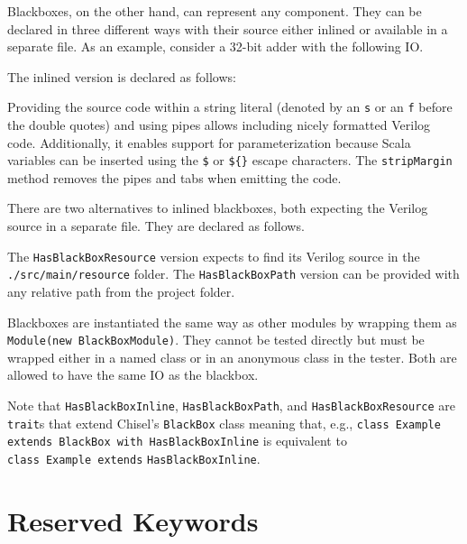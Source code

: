 \documentclass[%
    10pt,
    headinclude, footexclude,
    openright, %
    notitlepage,
    cleardoubleempty,
    headsepline,
    pointlessnumbers,
    bibtotoc, idxtotoc,
    ]{scrbook}
\newcommand{\code}[1]{{\small{\texttt{#1}}}}
\begin{document}

\noindent Blackboxes, on the other hand, can represent any component. They can be
declared in three different ways with their source either inlined or available in a
separate file. As an example, consider a 32-bit adder with the following IO.

\noindent The inlined version is declared as follows:

Providing the source code within a string literal (denoted by an \code{s} or an \code{f}
before the double quotes) and using pipes allows including nicely formatted Verilog code.
Additionally, it enables support for parameterization because Scala variables can be
inserted using the \code{\$} or \code{\$\{\}} escape characters. The \code{stripMargin}
method removes the pipes and tabs when emitting the code.

There are two alternatives to inlined blackboxes, both expecting the Verilog source in
a separate file. They are declared as follows.

The \code{HasBlackBoxResource} version expects to find its Verilog source
in the\\
\code{./src/main/resource} folder.
The \code{HasBlackBoxPath} version can be provided with any relative path from the project
folder.

Blackboxes are instantiated the same way as other modules by wrapping them as
\code{Module(new BlackBoxModule)}. They cannot be tested directly but must be wrapped
either in a named class or in an anonymous class in the tester. Both are allowed to have
the same IO as the blackbox.

Note that \code{HasBlackBoxInline}, \code{HasBlackBoxPath}, and \code{HasBlackBoxResource}
are \code{trait}s that extend Chisel's \code{BlackBox} class meaning that, e.g.,
\code{class Example extends BlackBox with HasBlackBoxInline} is equivalent to\\
\code{class Example extends} \code{HasBlackBoxInline}.


\chapter{Reserved Keywords}
\label{sec:reserved}
\end{document}

